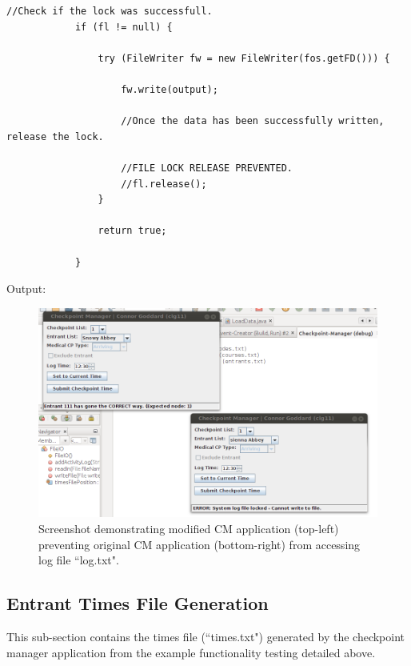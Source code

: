 \documentclass[a4paper, 10pt]{article}
\begin{document}
\begin{lstlisting}[style=customjava, caption=File export code modified to prevent a file lock being released once accessed.]
  //Check if the lock was successfull.
            if (fl != null) {

                try (FileWriter fw = new FileWriter(fos.getFD())) {

                    fw.write(output);

                    //Once the data has been successfully written, release the lock.
                    
                    //FILE LOCK RELEASE PREVENTED.
                    //fl.release();
                }

                return true;

            }

\end{lstlisting}

Output:
\begin{figure}[ht!]
\centering
\includegraphics[scale=0.65]{cm-filelock.png}
\caption{Screenshot demonstrating modified CM application (top-left) preventing original CM application (bottom-right) from accessing log file ``log.txt".}
\end{figure}

\clearpage
\subsection{Entrant Times File Generation}

This sub-section contains the times file (``times.txt") generated by the checkpoint manager application from the example functionality testing detailed above.


\end{document}
